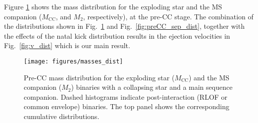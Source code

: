 \documentclass{aa}
\DeclareRobustCommand{\Figref}[1]{Fig.~\ref{#1}}
\begin{document}
Figure \ref{fig:preCC_mass_dist} shows the mass distribution for the
exploding star and the MS companion ($M_\mathrm{CC}$, and $M_2$,
respectively), at the pre-CC stage. The combination of the
distributions shown in \Figref{fig:preCC_mass_dist} and
\Figref{fig:preCC_sep_dist}, together with the effects of the natal
kick distribution results in the ejection velocities in
\Figref{fig:v_dist} which is our main result.

\begin{figure}[htbp]
  \texttt{[image: figures/masses\_dist]}
  \caption{Pre-CC mass distribution for the exploding star
    ($M_\mathrm{CC}$) and the MS companion ($M_2$) binaries with a
    collapsing star and a main sequence companion. Dashed
    histograms indicate post-interaction (RLOF or common envelope)
    binaries. The top panel shows the corresponding cumulative
    distributions.}
  \label{fig:preCC_mass_dist}
\end{figure}
\end{document}

